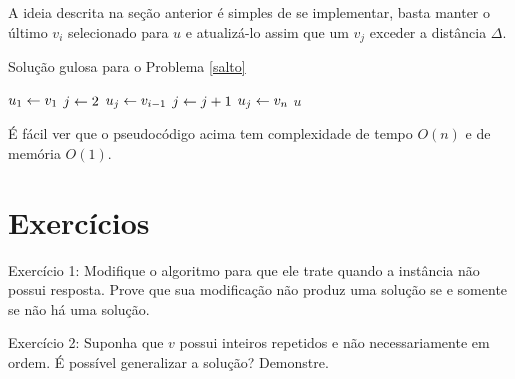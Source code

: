 A ideia descrita na seção anterior é simples de se implementar, basta manter o último $v_i$ selecionado para $u$ e atualizá-lo assim que um $v_j$ exceder a distância $\Delta$.

\begin{algorithm}[H]
\caption{Solução gulosa para o Problema \ref{salto}}
\label{salto:code}
\begin{algorithmic}[1]
    \State $u_1 \leftarrow v_1$
    \State $j \leftarrow 2$
            \State $u_j \leftarrow v_{i - 1}$
            \State $j \leftarrow j + 1$
        \EndIf
    \EndFor
    \State $u_j \leftarrow v_n$
    \State \Return $u$
\EndFunction
\end{algorithmic}
\end{algorithm}

É fácil ver que o pseudocódigo acima tem complexidade de tempo $O(n)$ e de memória $O(1)$.

\section{Exercícios}

Exercício 1: Modifique o algoritmo para que ele trate quando a instância não possui resposta. Prove que sua modificação não produz uma solução se e somente se não há uma solução.

Exercício 2: Suponha que $v$ possui inteiros repetidos e não necessariamente em ordem. É possível generalizar a solução? Demonstre.

